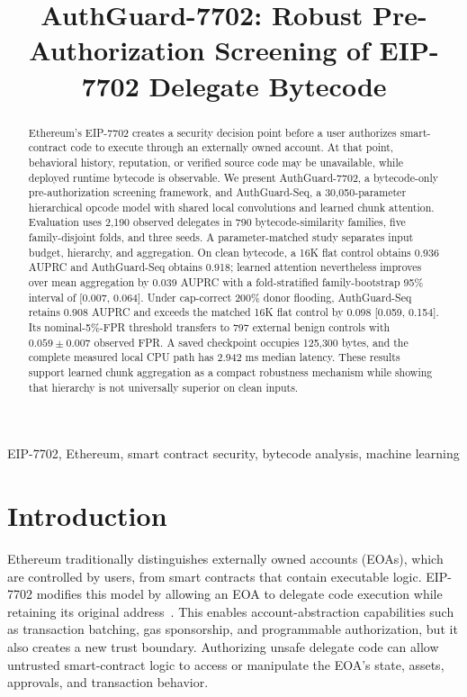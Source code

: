 \documentclass[conference]{IEEEtran}
\begin{document}
\title{AuthGuard-7702: Robust Pre-Authorization Screening of EIP-7702 Delegate Bytecode}



\maketitle

\begin{abstract}
Ethereum's EIP-7702 creates a security decision point before a user authorizes smart-contract code to execute through an externally owned account. At that point, behavioral history, reputation, or verified source code may be unavailable, while deployed runtime bytecode is observable. We present AuthGuard-7702, a bytecode-only pre-authorization screening framework, and AuthGuard-Seq, a 30,050-parameter hierarchical opcode model with shared local convolutions and learned chunk attention. Evaluation uses 2,190 observed delegates in 790 bytecode-similarity families, five family-disjoint folds, and three seeds. A parameter-matched study separates input budget, hierarchy, and aggregation. On clean bytecode, a 16K flat control obtains 0.936 AUPRC and AuthGuard-Seq obtains 0.918; learned attention nevertheless improves over mean aggregation by 0.039 AUPRC with a fold-stratified family-bootstrap 95\% interval of [0.007, 0.064]. Under cap-correct 200\% donor flooding, AuthGuard-Seq retains 0.908 AUPRC and exceeds the matched 16K flat control by 0.098 [0.059, 0.154]. Its nominal-5\%-FPR threshold transfers to 797 external benign controls with $0.059\pm0.007$ observed FPR. A saved checkpoint occupies 125,300 bytes, and the complete measured local CPU path has 2.942 ms median latency. These results support learned chunk aggregation as a compact robustness mechanism while showing that hierarchy is not universally superior on clean inputs.
\end{abstract}

\begin{IEEEkeywords}
EIP-7702, Ethereum, smart contract security, bytecode analysis, machine learning
\end{IEEEkeywords}

\section{Introduction}
\label{sec:intro}

Ethereum traditionally distinguishes externally owned accounts (EOAs), which are controlled by users, from smart contracts that contain executable logic. EIP-7702 modifies this model by allowing an EOA to delegate code execution while retaining its original address~\cite{eip7702}. This enables account-abstraction capabilities such as transaction batching, gas sponsorship, and programmable authorization, but it also creates a new trust boundary. Authorizing unsafe delegate code can allow untrusted smart-contract logic to access or manipulate the EOA's state, assets, approvals, and transaction behavior.
\end{document}
